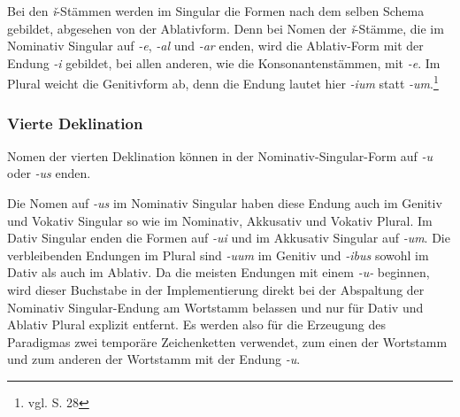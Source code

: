 Bei den \textit{ǐ}-Stämmen werden im Singular die Formen nach dem selben Schema gebildet, abgesehen von der Ablativform. Denn bei Nomen der \textit{ǐ}-Stämme, die im Nominativ Singular auf \textit{-e}, \textit{-al} und \textit{-ar} enden, wird die Ablativ-Form mit der Endung \textit{-i} gebildet, bei allen anderen, wie die Konsonantenstämmen, mit \textit{-e}. Im Plural weicht die Genitivform ab, denn die Endung lautet hier \textit{-ium} statt \textit{-um}.\footnote{vgl. \cite{BAYER-LINDAUER1994} S. 28} \par
\FloatBarrier
\subsubsection{Vierte Deklination}
Nomen der vierten Deklination können in der Nominativ-Singular-Form auf \textit{-u} oder \textit{-us} enden. \par
Die Nomen auf \textit{-us} im Nominativ Singular haben diese Endung auch im Genitiv und Vokativ Singular so wie im Nominativ, Akkusativ und Vokativ Plural. Im Dativ Singular enden die Formen auf \textit{-ui} und im Akkusativ Singular auf \textit{-um}. Die verbleibenden Endungen im Plural sind \textit{-uum} im Genitiv und \textit{-ibus} sowohl im Dativ als auch im Ablativ. Da die meisten Endungen mit einem \textit{-u-} beginnen, wird dieser Buchstabe in der Implementierung direkt bei der Abspaltung der Nominativ Singular-Endung am Wortstamm belassen und nur für Dativ und Ablativ Plural explizit entfernt. Es werden also für die Erzeugung des Paradigmas zwei temporäre Zeichenketten verwendet, zum einen der Wortstamm und zum anderen der Wortstamm mit der Endung \textit{-u}. \par
